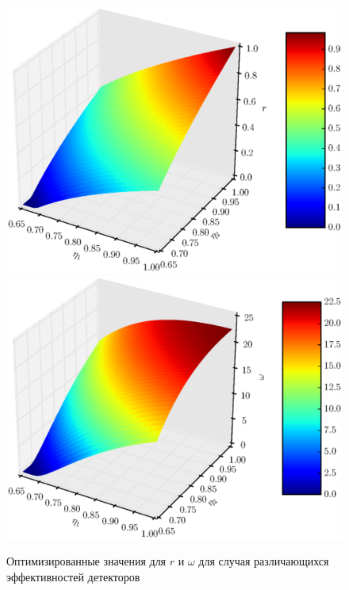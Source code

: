 \documentclass[%
master,         %
subf,           %
href,           %
colorlinks=true %
]{disser}
\numberwithin{equation}{section}
\numberwithin{figure}{section}
\begin{document}
\begin{figure}[h]
\includegraphics[scale=0.7]{r3d.eps}
\includegraphics[scale=0.7]{omega3d.eps}
\caption{Оптимизированные значения для $r$ и $\omega$ для случая различающихся эффективностей детекторов}
\label{fig:psi_opt_3d}
\end{figure}
\end{document}
